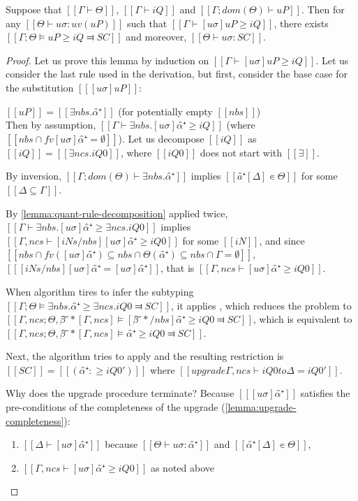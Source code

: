 \begin{lemma} \label{lemma:pos-subt-completeness}
    Suppose that $[[Γ ⊢ Θ]]$, $[[Γ ⊢ iQ]]$ and $[[Γ ; dom(Θ) ⊢  uP]]$.
    Then for any $[[Θ ⊢ uσ : uv(uP)]]$ such that $[[ Γ ⊢ [uσ]uP ≥ iQ ]]$,
    there exists $[[Γ; Θ ⊨ uP ≥ iQ ⫤ SC]]$ and moreover, $[[ Θ ⊢ uσ : SC ]]$.
\end{lemma}
\begin{proof}
    Let us prove this lemma by induction on $[[ Γ ⊢ [uσ]uP ≥ iQ ]]$.
    Let us consider the last rule used in the derivation,
    but first, consider the base case for the substitution $[[ [uσ]uP ]]$:
    \begin{caseof}
        \item \label{case:pos-subt-complete-base} $[[uP]] = [[ ∃nbs.α̂⁺ ]]$ 
            (for potentially empty $[[nbs]]$)\\
            Then by assumption, $[[ Γ ⊢ ∃nbs.[uσ]α̂⁺ ≥ iQ ]]$ (where $[[ {nbs} ∩ fv [uσ]α̂⁺ = ∅]]$).
            Let us decompose $[[iQ]]$ as $[[iQ]] = [[∃ncs.iQ0]]$, where $[[iQ0]]$ does
            not start with $[[∃]]$. 

            By inversion, $[[Γ ; dom(Θ) ⊢  ∃nbs.α̂⁺]]$ implies $[[â⁺[Δ] ∊ Θ]]$ for some 
            $[[{Δ} ⊆ {Γ}]]$.

            By \cref{lemma:quant-rule-decomposition} applied twice, 
            $[[ Γ ⊢ ∃nbs.[uσ]α̂⁺ ≥ ∃ncs.iQ0 ]]$ implies
            $[[ Γ,ncs  ⊢ [iNs/nbs][uσ]α̂⁺ ≥ iQ0 ]]$ for some $[[iN]]$, 
            and since $[[ {nbs} ∩ fv([uσ]α̂⁺) ⊆ {nbs} ∩ {Θ(α̂⁺)} ⊆ {nbs} ∩ {Γ} = ∅ ]]$,
            $[[ [iNs/nbs][uσ]α̂⁺ = [uσ]α̂⁺ ]]$, that is $[[ Γ,ncs ⊢ [uσ]α̂⁺ ≥ iQ0]]$.

            When algorithm tires to infer the subtyping 
            $[[Γ; Θ ⊨ ∃nbs.α̂⁺ ≥ ∃ncs.iQ0 ⫤ SC]]$,
            it applies ,
            which reduces the problem to
            $[[Γ, ncs; Θ, β̂⁻*[Γ, ncs] ⊨ [β̂⁻*/nbs] α̂⁺ ≥ iQ0 ⫤ SC]]$, 
            which is equivalent to 
            $[[Γ, ncs; Θ, β̂⁻*[Γ, ncs] ⊨ α̂⁺ ≥ iQ0 ⫤ SC]]$.

            Next, the algorithm tries to apply
            and the resulting restriction is $[[SC]] = [[(α̂⁺ :≥ iQ0')]]$ where
            $[[upgrade Γ, ncs ⊢ iQ0 to Δ = iQ0']]$.

            Why does the upgrade procedure terminate?
            Because $[[ [uσ]α̂⁺ ]]$ satisfies the pre-conditions of the completeness of the upgrade
            (\cref{lemma:upgrade-completeness}):
            \begin{enumerate}
                \item $[[Δ ⊢ [uσ]α̂⁺ ]]$ because $[[Θ ⊢ uσ : α̂⁺]]$ and $[[α̂⁺[Δ] ∊ Θ]]$,
                \item $[[ Γ,ncs ⊢ [uσ]α̂⁺ ≥ iQ0]]$ as noted above
            \end{enumerate}


\end{caseof}
\end{proof}
